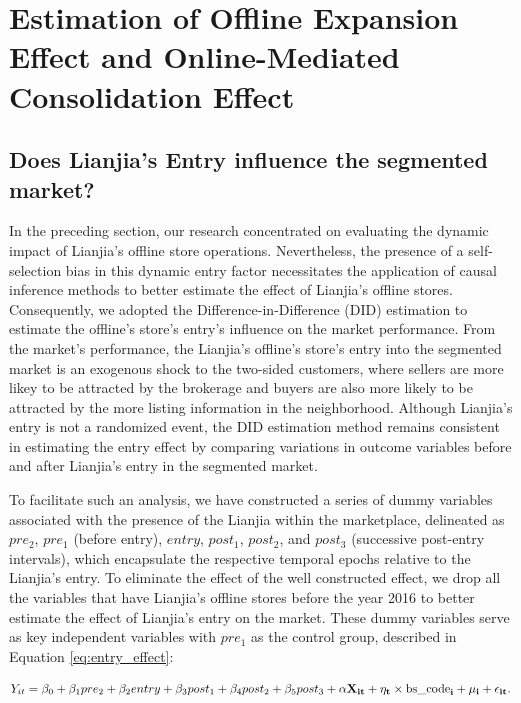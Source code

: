 \documentclass[11pt]{article}
\begin{document}
\section{Estimation of Offline Expansion Effect and Online-Mediated Consolidation Effect} \label{sec:mechanism_design}

\subsection{Does Lianjia's Entry influence the segmented market?} \label{subsec:entry_effect}

In the preceding section, our research concentrated on evaluating the dynamic impact of Lianjia's offline store operations. Nevertheless, the presence of a self-selection bias in this dynamic entry factor necessitates the application of causal inference methods to better estimate the effect of Lianjia's offline stores. Consequently, we adopted the Difference-in-Difference (DID) estimation to estimate the offline's store's entry's influence on the market performance. From the market's performance, the Lianjia's offline's store's entry into the segmented market is an exogenous shock to the two-sided customers, where sellers are more likey to be attracted by the brokerage and buyers are also more likely to be attracted by the more listing information in the neighborhood. Although Lianjia's entry is not a randomized event, the DID estimation method remains consistent in estimating the entry effect by comparing variations in outcome variables before and after Lianjia's entry in the segmented market.

To facilitate such an analysis, we have constructed a series of dummy variables associated with the presence of the Lianjia within the marketplace, delineated as $pre_2$, $pre_1$ (before entry), $entry$, $post_1$, $post_2$, and $post_3$ (successive post-entry intervals), which encapsulate the respective temporal epochs relative to the Lianjia's entry. To eliminate the effect of the well constructed effect, we drop all the variables that have Lianjia's offline stores before the year 2016 to better estimate the effect of Lianjia's entry on the market. These dummy variables serve as key independent variables with $pre_1$ as the control group, described in Equation \eqref{eq:entry_effect}:

\begin{equation}
  Y_{it} = \beta_0 +  \beta_1 pre_2 + \beta_2 entry + \beta_3 post_1 + \beta_4 post_2 + \beta_5 post_3 + \bf{\alpha} \bf{X}_{it} + \eta_{t} \times \text{bs\_code}_i + \mu_i + \epsilon_{it}.   \label{eq:entry_effect}
\end{equation}
\end{document}
